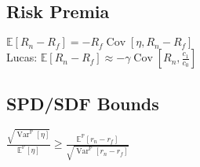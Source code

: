 	\subsection*{Risk Premia}
	$\mathbb{E}\left[R_{n} - R_{f}\right] = -R_{f}\operatorname{Cov}\left[\eta, R_{n} - R_{f}\right]$\\
	Lucas: $\mathbb{E}\left[R_{n} - R_{f}\right]\approx -\gamma\operatorname{Cov}\left[R_{n}, \frac{c_{1}}{c_{0}}\right]$
	
	\subsection*{SPD/SDF Bounds}
	$\frac{\sqrt{\operatorname{Var}^{\mathbb{P}}\left[\eta\right]}}{\mathbb{E}^{\mathbb{P}}\left[\eta\right]}\geq\frac{\mathbb{E}^{\mathbb{P}}\left[r_{n} - r_{f}\right]}{\sqrt{\operatorname{Var}^{\mathbb{P}}\left[r_{n} - r_{f}\right]}}$
